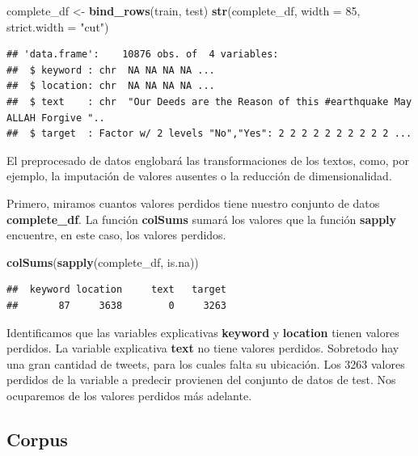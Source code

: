 \documentclass[]{article}
\newenvironment{Shaded}{\begin{snugshade}}{\end{snugshade}}
\newcommand{\DataTypeTok}[1]{\textcolor[rgb]{0.13,0.29,0.53}{#1}}
\newcommand{\DecValTok}[1]{\textcolor[rgb]{0.00,0.00,0.81}{#1}}
\newcommand{\KeywordTok}[1]{\textcolor[rgb]{0.13,0.29,0.53}{\textbf{#1}}}
\newcommand{\NormalTok}[1]{#1}
\newcommand{\StringTok}[1]{\textcolor[rgb]{0.31,0.60,0.02}{#1}}
\begin{document}
\begin{Shaded}
\begin{Highlighting}[]
\NormalTok{complete_df <-}\StringTok{ }\KeywordTok{bind_rows}\NormalTok{(train, test)}
\KeywordTok{str}\NormalTok{(complete_df, }\DataTypeTok{width =} \DecValTok{85}\NormalTok{, }\DataTypeTok{strict.width =} \StringTok{"cut"}\NormalTok{)}
\end{Highlighting}
\end{Shaded}

\begin{verbatim}
## 'data.frame':    10876 obs. of  4 variables:
##  $ keyword : chr  NA NA NA NA ...
##  $ location: chr  NA NA NA NA ...
##  $ text    : chr  "Our Deeds are the Reason of this #earthquake May ALLAH Forgive "..
##  $ target  : Factor w/ 2 levels "No","Yes": 2 2 2 2 2 2 2 2 2 2 ...
\end{verbatim}

El preprocesado de datos englobará las transformaciones de los textos,
como, por ejemplo, la imputación de valores ausentes o la reducción de
dimensionalidad.

Primero, miramos cuantos valores perdidos tiene nuestro conjunto de
datos \textbf{complete\_df}. La función \textbf{colSums} sumará los
valores que la función \textbf{sapply} encuentre, en este caso, los
valores perdidos.

\begin{Shaded}
\begin{Highlighting}[]
\KeywordTok{colSums}\NormalTok{(}\KeywordTok{sapply}\NormalTok{(complete_df, is.na))}
\end{Highlighting}
\end{Shaded}

\begin{verbatim}
##  keyword location     text   target 
##       87     3638        0     3263
\end{verbatim}

Identificamos que las variables explicativas \textbf{keyword} y
\textbf{location} tienen valores perdidos. La variable explicativa
\textbf{text} no tiene valores perdidos. Sobretodo hay una gran cantidad
de tweets, para los cuales falta su ubicación. Los 3263 valores perdidos
de la variable a predecir provienen del conjunto de datos de test. Nos
ocuparemos de los valores perdidos más adelante.

\hypertarget{corpus}{%
\subsection{Corpus}\label{corpus}}
\end{document}
